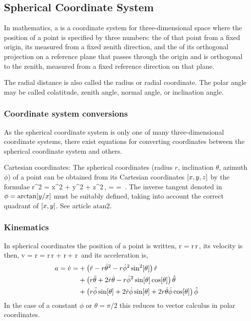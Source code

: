 \subsection{Spherical Coordinate System}
In mathematics, a  is a coordinate system for three-dimensional space where the position of a point is specified by three numbers: the  of that point from a fixed origin, its  measured from a fixed zenith direction, and the  of its orthogonal projection on a reference plane that passes through the origin and is orthogonal to the zenith, measured from a fixed reference direction on that plane.

The radial distance is also called the radius or radial coordinate. The polar angle may be called colatitude, zenith angle, normal angle, or inclination angle.


\subsubsection{Coordinate system conversions}
As the spherical coordinate system is only one of many three-dimensional coordinate systems, there exist equations for converting coordinates between the spherical coordinate system and others.

Cartesian coordinates: The spherical coordinates (radius $r$, inclination $\theta$, azimuth $\phi$) of a point can be obtained from its Cartesian coordinates $\left[{x,y,z}\right]$ by the formulae
\beq
r^2 = x^2 + y^2 + z^2\,,\qquad 
\theta = \arccos{}\qquad{}\qquad 
\phi = \arctan{}\,.
\eeq
The inverse tangent denoted in $\phi = \arctan\!\left[{y/x}\right]$ must be suitably defined, taking into account the correct quadrant of $\left[{x,y}\right]$. See article $\text{atan2}$.


\subsubsection{Kinematics}
In spherical coordinates the position of a point is written,
\beq
r = r\,\nvec r\,,
\eeq
its velocity is then,
\beq
v = \dt r = \dt r\,\nvec r + r\dt\theta\,\nvec\theta + r\dt\phi\sin\vat\theta\,\nvec\phi
\eeq
and its acceleration is,
\begin{align*}
a = \dot{v} 
  = & + \left(\ddot{r} - r\dot{\theta}^2 - r\dot{\phi}^2\sin^2\!\left[{\theta}\right] \right)\hat{r}\\
    & + \left(r\ddot{\theta} + 2\dot{r}\dot{\theta} - r\dot{\phi}^2\sin\!\left[{\theta}\right]\cos\!\left[{\theta}\right]\right)\hat{\theta}\\
    & + \left(r\ddot{\phi}\sin\!\left[{\theta}\right] 
        + 2\dot{r}\dot{\phi}\sin\!\left[{\theta}\right] 
        + 2r\dot{\theta}\dot{\phi}\cos\!\left[{\theta}\right]\right)\hat{\phi}\\
\end{align*}
In the case of a constant $\phi$ or $\theta = \pi/2$ this reduces to vector calculus in polar coordinates.


